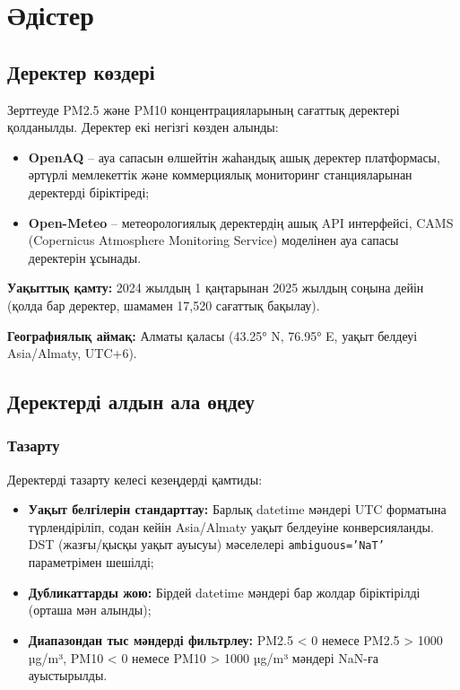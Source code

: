 \documentclass[12pt,a4paper]{article}
\begin{document}
\section{Әдістер}

\subsection{Деректер көздері}

Зерттеуде PM2.5 және PM10 концентрацияларының сағаттық деректері қолданылды. Деректер екі негізгі көзден алынды:

\begin{itemize}
\item \textbf{OpenAQ} – ауа сапасын өлшейтін жаһандық ашық деректер платформасы, әртүрлі мемлекеттік және коммерциялық мониторинг станцияларынан деректерді біріктіреді;
\item \textbf{Open-Meteo} – метеорологиялық деректердің ашық API интерфейсі, CAMS (Copernicus Atmosphere Monitoring Service) моделінен ауа сапасы деректерін ұсынады.
\end{itemize}

\textbf{Уақыттық қамту:} 2024 жылдың 1 қаңтарынан 2025 жылдың соңына дейін (қолда бар деректер, шамамен 17,520 сағаттық бақылау).

\textbf{Географиялық аймақ:} Алматы қаласы (43.25° N, 76.95° E, уақыт белдеуі Asia/Almaty, UTC+6).

\subsection{Деректерді алдын ала өңдеу}

\subsubsection{Тазарту}

Деректерді тазарту келесі кезеңдерді қамтиды:
\begin{itemize}
\item \textbf{Уақыт белгілерін стандарттау:} Барлық datetime мәндері UTC форматына түрлендіріліп, содан кейін Asia/Almaty уақыт белдеуіне конверсияланды. DST (жазғы/қысқы уақыт ауысуы) мәселелері \texttt{ambiguous='NaT'} параметрімен шешілді;
\item \textbf{Дубликаттарды жою:} Бірдей datetime мәндері бар жолдар біріктірілді (орташа мән алынды);
\item \textbf{Диапазондан тыс мәндерді фильтрлеу:} PM2.5 < 0 немесе PM2.5 > 1000 µg/m³, PM10 < 0 немесе PM10 > 1000 µg/m³ мәндері NaN-ға ауыстырылды.
\end{itemize}
\end{document}
